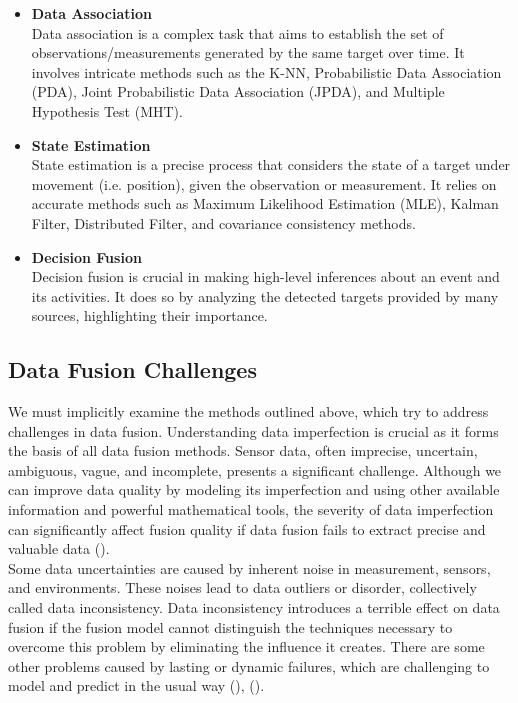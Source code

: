 \begin{enumerate}
\begin{itemize}
    \item\textbf{Data Association} \\Data association is a complex task that aims to establish the set of observations/measurements generated by the same target over time. It involves intricate methods such as the K-NN, Probabilistic Data Association (PDA), Joint Probabilistic Data Association (JPDA), and Multiple Hypothesis Test (MHT).    
    \item\textbf{State Estimation} \\State estimation is a precise process that considers the state of a target under movement (i.e. position), given the observation or measurement. It relies on accurate methods such as Maximum Likelihood Estimation (MLE), Kalman Filter, Distributed Filter, and covariance consistency methods. 
    \item\textbf{Decision Fusion} \\Decision fusion is crucial in making high-level inferences about an event and its activities. It does so by analyzing the detected targets provided by many sources, highlighting their importance.
    \end{itemize}
\end{enumerate}


\subsection{Data Fusion Challenges}
We must implicitly examine the methods outlined above, which try to address challenges in data fusion. 
Understanding data imperfection is crucial as it forms the basis of all data fusion methods. Sensor data, often imprecise, uncertain, ambiguous, vague, and incomplete, presents a significant challenge. Although we can improve data quality by modeling its imperfection and using other available information and powerful mathematical tools, the severity of data imperfection can significantly affect fusion quality if data fusion fails to extract precise and valuable data (\cite{khaleghi2013multisensor}).\\

Some data uncertainties are caused by inherent noise in measurement, sensors, and environments. These noises lead to data outliers or disorder, collectively called data inconsistency.  Data inconsistency introduces a terrible effect on data fusion if the fusion model cannot distinguish the techniques necessary to overcome this problem by eliminating the influence it creates. There are some other problems caused by lasting or dynamic failures, which are challenging to model and predict in the usual way (\cite{bakr2017distributed}), (\cite{khaleghi2013multisensor}).\\

